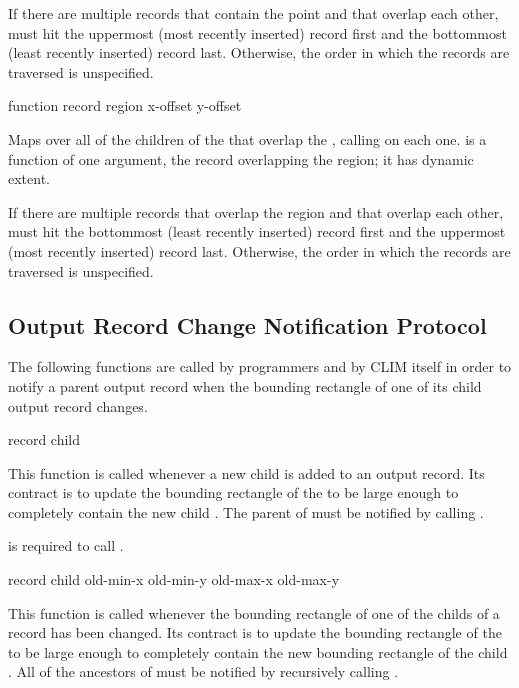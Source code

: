 If there are multiple records that contain the point and that overlap each
other,  must hit the uppermost
(most recently inserted) record first and the bottommost (least recently
inserted) record last.  Otherwise, the order in which the records are traversed
is unspecified.

            {function record region \optional x-offset y-offset}

Maps over all of the children of the   that
overlap the  , calling  on each one.
 is a function of one argument, the record overlapping the region;
it has dynamic extent.

If there are multiple records that overlap the region and that overlap each
other,  must hit the bottommost
(least recently inserted) record first and the uppermost (most recently
inserted) record last.  Otherwise, the order in which the records are traversed
is unspecified.


\subsection {Output Record Change Notification Protocol}

The following functions are called by programmers and by CLIM itself in order to
notify a parent output record when the bounding rectangle of one of its child output
record changes.

 {record child}

This function is called whenever a new child is added to an output record.  Its
contract is to update the bounding rectangle of the 
 to be large enough to completely contain the new child  . The parent of  must be notified by calling
.

 is required to call .

 {record child 
                                                  old-min-x old-min-y old-max-x old-max-y} 

This function is called whenever the bounding rectangle of one of the childs of
a record has been changed.  Its contract is to update the bounding rectangle of
the   to be large enough to completely contain
the new bounding rectangle of the child  .  All
of the ancestors of  must be notified by recursively calling
.

